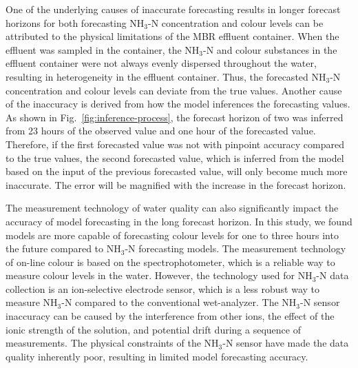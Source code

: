 One of the underlying causes of inaccurate forecasting results in longer forecast horizons for both forecasting NH$_{3}$-N concentration and colour levels can be attributed to the physical limitations of the MBR effluent container. When the effluent was sampled in the container, the NH$_{3}$-N and colour substances in the effluent container were not always evenly dispersed throughout the water, resulting in heterogeneity in the effluent container. Thus, the forecasted NH$_{3}$-N concentration and colour levels can deviate from the true values. Another cause of the inaccuracy is derived from how the model inferences the forecasting values. As shown in Fig.~\ref{fig:inference-process}, the forecast horizon of two was inferred from 23 hours of the observed value and one hour of the forecasted value. Therefore, if the first forecasted value was not with pinpoint accuracy compared to the true values, the second forecasted value, which is inferred from the model based on the input of the previous forecasted value, will only become much more inaccurate. The error will be magnified with the increase in the forecast horizon.

The measurement technology of water quality can also significantly impact the accuracy of model forecasting in the long forecast horizon. In this study, we found models are more capable of forecasting colour levels for one to three hours into the future compared to NH$_{3}$-N forecasting models. The measurement technology of on-line colour is based on the spectrophotometer, which is a reliable way to measure colour levels in the water. However, the technology used for NH$_{3}$-N data collection is an ion-selective electrode sensor, which is a less robust way to measure NH$_{3}$-N compared to the conventional wet-analyzer. The NH$_{3}$-N sensor inaccuracy can be caused by the interference from other ions, the effect of the ionic strength of the solution, and potential drift during a sequence of measurements. The physical constraints of the NH$_{3}$-N sensor have made the data quality inherently poor, resulting in limited model forecasting accuracy.
